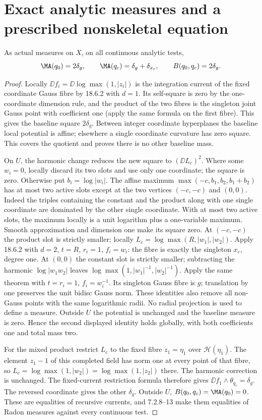\section{Exact analytic measures and a prescribed nonskeletal equation}
\begin{lemma}\label{newns:products}
As actual measures on $X$, on all continuous analytic tests,
\[
 \MA(q_0)=2\delta_g,\qquad
 \MA(q_c)=\delta_g+\delta_{x_c},\qquad
 B(q_0,q_c)=2\delta_g.
\]
\end{lemma}
\begin{proof}
Locally $\DD f_i=\DD\log\max(1,|z_i|)$ is the integration
current of the fixed coordinate Gauss fibre by 18.6.2 with $d=1$.
Its self-square is zero by the one-coordinate dimension rule, and the
product of the two fibres is the singleton joint Gauss point with
coefficient one (apply the same formula on the first fibre).
This gives the baseline square $2\delta_g$. Between integer coordinate
hyperplanes the baseline local potential is affine; elsewhere a single
coordinate curvature has zero square. This covers the quotient and
proves there is no other baseline mass.

On $U$, the harmonic change reduces the new square to $(\DD L_c)^2$.
Where some $w_i=0$, locally discard its two slots and use only one
coordinate; the square is zero. Otherwise put $b_i=\log|w_i|$.
The affine maximum $\max(-c,b_1,b_2,b_1+b_2)$ has at most two
active slots except at the two vertices $(-c,-c)$ and $(0,0)$.
Indeed the triples containing the constant and the product along with
one single coordinate are dominated by the other single coordinate.
With at most two active slots, the maximum locally is a unit logarithm
plus a one-variable maximum. Smooth approximation and dimension one
make its square zero. At $(-c,-c)$ the product slot is strictly smaller;
locally $L_c=\log\max(R,|w_1|,|w_2|)$.
Apply 18.6.2 with $d=2$, $t=R$, $r_i=1$, $f_i=w_i$:
the fibre is exactly the singleton $x_c$, degree one.
At $(0,0)$ the constant slot is strictly smaller; subtracting
the harmonic $\log|w_1w_2|$ leaves
$\log\max(1,|w_1|^{-1},|w_2|^{-1})$.
Apply the same theorem with $t=r_i=1$, $f_i=w_i^{-1}$.
Its singleton Gauss fibre is $g$; translation by one preserves the
unit bidisc Gauss norm. These identities also remove all non-Gauss
points with the same logarithmic radii. No radial projection is used
to define a measure. Outside $U$ the potential is unchanged and the
baseline measure is zero. Hence the second displayed identity holds
globally, with both coefficients one and total mass two.

For the mixed product restrict $L_c$ to the fixed fibre
$z_1=\eta_1$ over $\mathscr H(\eta_1)$. The element $z_1-1$ of
this completed field has norm one at every point of that fibre, so
$L_c=\log\max(1,|w_2|)=\log\max(1,|z_2|)$ there.
The harmonic correction is unchanged. The fixed-current restriction
formula therefore gives $\DD f_1\wedge\theta_{q_c}=\delta_g$.
The reversed coordinate gives the other $\delta_g$.
Outside $U$, $B(q_0,q_c)=\MA(q_0)=0$.
These are equalities of recursive currents, and 7.2.8--13 make them
equalities of Radon measures against every continuous test.
\end{proof}

